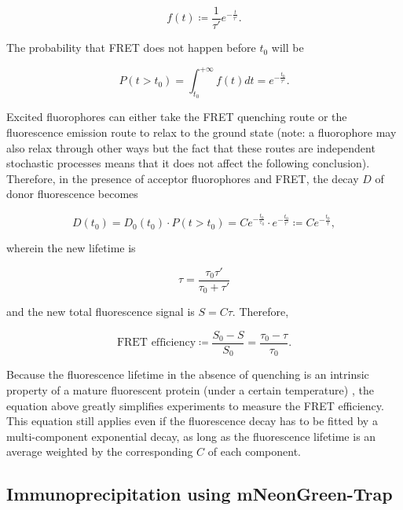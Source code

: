 \begin{equation*}
    f(t) \coloneqq \dfrac{1}{\tau'} e^{-\frac{t}{\tau'}}.
\end{equation*}

\noindent The probability that FRET does not happen before $t_0$ will be

\begin{equation*}
    P(t > t_0) = \int_{t_0}^{+\infty} f(t) dt = e^{-\frac{t_0}{\tau'}}.
\end{equation*}

\noindent Excited fluorophores can either take the FRET quenching route or the fluorescence emission route to relax to the ground state (note: a fluorophore may also relax through other ways but the fact that these routes are independent stochastic processes means that it does not affect the following conclusion). Therefore, in the presence of acceptor fluorophores and FRET, the decay $D$ of donor fluorescence becomes

\begin{equation*}
    D(t_0) =  D_0(t_0) \cdot P(t > t_0) = C e^{-\frac{t_0}{\tau_0}} \cdot e^{-\frac{t_0}{\tau'}} \coloneqq C e^{-\frac{t_0}{\tau}},
\end{equation*}

\noindent wherein the new lifetime is

\begin{equation*}
    \tau = \dfrac{\tau_0\tau'}{\tau_0 + \tau'}
\end{equation*}

and the new total fluorescence signal is $S =  C\tau$. Therefore,

\begin{equation*}
    \text{FRET efficiency} \coloneqq \frac{S_0-S}{S_0} = \frac{\tau_0-\tau}{\tau_0}.
\end{equation*}

Because the fluorescence lifetime in the absence of quenching is an intrinsic property of a mature fluorescent protein (under a certain temperature) \cite{FLTIsIntrinsic}, the equation above greatly simplifies experiments to measure the FRET efficiency. This equation still applies even if the fluorescence decay has to be fitted by a multi-component exponential decay, as long as the fluorescence lifetime is an average weighted by the corresponding $C$ of each component.

\subsection{Immunoprecipitation using mNeonGreen-Trap}
\label{mNGTrapMethod}

